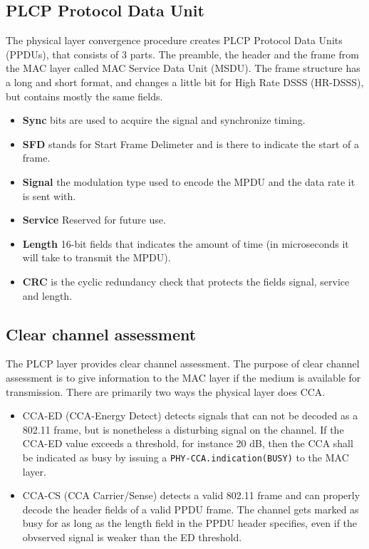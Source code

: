 	\subsection{PLCP Protocol Data Unit}
	The physical layer convergence procedure creates PLCP Protocol Data Units (PPDUs), 
	that consists of 3 parts. The preamble, the header and the frame from the MAC layer
	called MAC Service Data Unit (MSDU). The frame structure
	has a long and short format, and changes a little bit for High Rate DSSS (HR-DSSS),
	but contains mostly the same fields.



	\begin{itemize}
	\item \textbf{Sync} bits are used to acquire the signal and synchronize timing. 
	\item \textbf{SFD} stands for Start Frame Delimeter and is there to indicate the start of a frame.  
	\item \textbf{Signal} the modulation type used to encode the MPDU and
	the data rate it is sent with. 
	\item \textbf{Service} Reserved for future use. 
	\item \textbf{Length} 16-bit fields that indicates the amount of time (in
			microseconds it will take to transmit the MPDU).
	\item \textbf{CRC} is the cyclic redundancy check that protects
	the fields signal, service and length. 
	\end{itemize}

	\subsection{Clear channel assessment}
	The PLCP layer provides clear channel assessment.
	The purpose of clear channel assessment is to give information to the MAC
	layer if the medium is available for transmission. There
	are primarily two ways the physical layer does CCA.
	\begin{itemize}
	\item CCA-ED (CCA-Energy Detect) detects signals that can not be decoded as a 802.11 frame, but is nonetheless a disturbing signal on the channel. If the CCA-ED value
	exceeds a threshold, for instance 20 dB, then the CCA shall be indicated as
	busy by issuing a \verb|PHY-CCA.indication(BUSY)| to the MAC layer.  
	\item CCA-CS (CCA Carrier/Sense) detects a valid 802.11 frame and can
	properly decode the header fields of a valid PPDU frame.
	The channel gets marked as busy for as long as the length
	field in the PPDU header specifies, even if the obvserved
	signal is weaker than the ED threshold. 
	\end{itemize}

